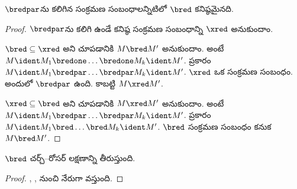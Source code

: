 \documentclass[../../../include/open-logic-section]{subfiles}
\begin{document}
\begin{lem}
  $\bredpar$ను కలిగిన సంక్రమణ సంబంధాలన్నిటిలో $\bred$ కనిష్ఠమైనది.
\end{lem}

\begin{proof}
  $\bredpar$ను కలిగి ఉండే కనిష్ఠ సంక్రమణ సంబంధాన్ని
  $\xred$ అనుకుందాం.

  $\bred \subseteq \xred$ అని చూపడానికి $M \bred M'$ అనుకుందాం.
  అంటే $M \ident M_1
  \bredone \dots \bredone M_k \ident M'$.
   ప్రకారం $M
  \ident M_1 \bredpar \dots \bredpar M_k \ident M'$.
  $\xred$ ఒక సంక్రమణ సంబంధం. అందులో $\bredpar$ ఉంది. కాబట్టి $M \xred M'$.

  $\xred \subseteq \bred$ అని చూపడానికి $M \xred M'$ అనుకుందాం.
  అంటే $M
  \ident M_1 \bredpar \dots \bredpar M_k \ident M'$.
   ప్రకారం $M \ident M_1
  \bred \dots \bred M_k \ident M'$. $\bred$
  సంక్రమణ సంబంధం కనుక $M \bred M'$.
\end{proof}

\begin{thm}
  $\bred$ చర్చ్--రోసర్ లక్షణాన్ని తీరుస్తుంది.
\end{thm}

\begin{proof}
  , ,
   నుంచి నేరుగా వస్తుంది.
\end{proof}
\end{document}
